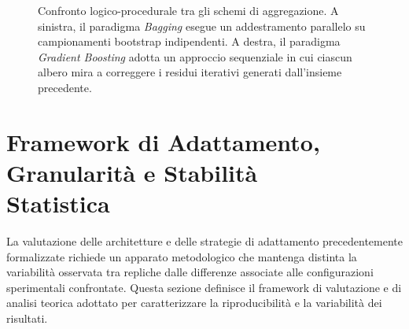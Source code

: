 \begin{figure}[H]
    \caption{Confronto logico-procedurale tra gli schemi di aggregazione. A sinistra, il paradigma \textit{Bagging} esegue un addestramento parallelo su campionamenti bootstrap indipendenti. A destra, il paradigma \textit{Gradient Boosting} adotta un approccio sequenziale in cui ciascun albero mira a correggere i residui iterativi generati dall'insieme precedente.}
    \label{fig:bagging_vs_boosting}
\end{figure}

\section[Framework di Adattamento, Granularità e Stabilità Statistica]{Framework di Adattamento, Granularità e Stabilità\\Statistica}
\label{sec:framework_adattamento}

La valutazione delle architetture e delle strategie di adattamento precedentemente formalizzate richiede un apparato metodologico che mantenga distinta la variabilità osservata tra repliche dalle differenze associate alle configurazioni sperimentali confrontate. 
Questa sezione definisce il framework di valutazione e di analisi teorica adottato per caratterizzare la riproducibilità e la variabilità dei risultati.

